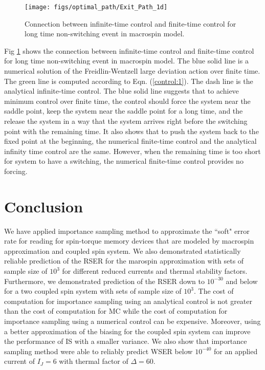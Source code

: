 \documentclass[journal,transmag]{IEEEtran}
\begin{document}
 \begin{figure}[h]
   \centering
         \texttt{[image: figs/optimal\_path/Exit\_Path\_1d]}
   \caption{Connection between infinite-time control and finite-time control for long time non-switching event in macrospin model.}
   \label{fig:Non_switching_path_1d}   
\end{figure}
Fig \ref{fig:Non_switching_path_1d} shows the connection between infinite-time control and finite-time control for long time non-switching event in macrospin model. The blue solid line is a numerical solution of the Freidlin-Wentzell large deviation action over finite time. The green line is computed according to Eqn. (\ref{control:1}). The dash line is the analytical infinite-time control. The blue solid line suggests that to achieve minimum control over finite time, the control should force the system near the saddle point, keep the system near the saddle point for a long time, and the release the system in a way that the system arrives right before the switching point with the remaining time. It also shows that to push the system back to the fixed point at the beginning, the numerical finite-time control and the analytical infinity time control are the same. However, when the remaining time is too short for system to have a switching, the numerical finite-time control provides no forcing.   
 \section{Conclusion}
We have applied importance sampling method to approximate the ``soft" error rate for reading for spin-torque memory devices that are modeled by macrospin approximation and coupled spin system. We also demonstrated statistically reliable prediction of the RSER for the marospin approximation with sets of sample size of $10^3$ for different reduced currents and thermal stability factors. Furthermore,  we  demonstrated prediction of the RSER down to $10^{-30}$ and below for a two coupled spin system with sets of sample size of $10^3$.   The cost of computation for importance sampling using an analytical control is not greater than the cost of computation for MC while the cost of computation for importance sampling using a numerical control can be expensive.  Moreover, using a better approximation of the biasing for the coupled spin system can improve the performance of IS with a smaller variance. We also show that importance sampling method were able to reliably predict WSER below $10^{-40}$ for an applied current of $I_J = 6$ with thermal factor of $\Delta = 60$.
 
\end{document}
